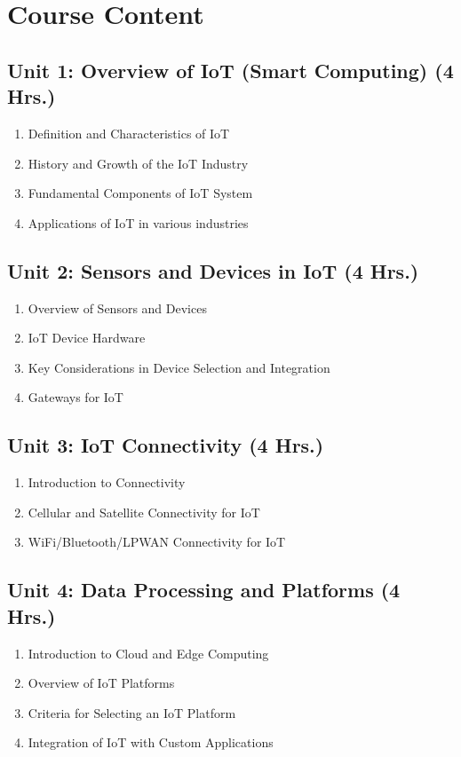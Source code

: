 \section{Course Content}

\subsection*{Unit 1: Overview of IoT (Smart Computing) (4 Hrs.)}
\begin{enumerate}
    \item Definition and Characteristics of IoT
    \item History and Growth of the IoT Industry
    \item Fundamental Components of IoT System
    \item Applications of IoT in various industries
\end{enumerate}

\subsection*{Unit 2: Sensors and Devices in IoT (4 Hrs.)}
\begin{enumerate}
    \item Overview of Sensors and Devices
    \item IoT Device Hardware
    \item Key Considerations in Device Selection and Integration
    \item Gateways for IoT
\end{enumerate}

\subsection*{Unit 3: IoT Connectivity (4 Hrs.)}
\begin{enumerate}
    \item Introduction to Connectivity
    \item Cellular and Satellite Connectivity for IoT
    \item WiFi/Bluetooth/LPWAN Connectivity for IoT
\end{enumerate}

\subsection*{Unit 4: Data Processing and Platforms (4 Hrs.)}
\begin{enumerate}
    \item Introduction to Cloud and Edge Computing
    \item Overview of IoT Platforms
    \item Criteria for Selecting an IoT Platform
    \item Integration of IoT with Custom Applications
\end{enumerate}


